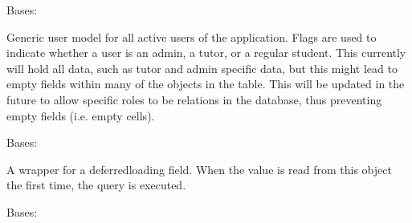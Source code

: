 \documentclass[letterpaper,10pt,english]{sphinxmanual}
\begin{document}
\begin{fulllineitems}
\label{\detokenize{models/user:api.models.user.User}}
\pysigstartsignatures
{}
\pysigstopsignatures
\sphinxAtStartPar
Bases: 

\sphinxAtStartPar
Generic user model for all active users of the application. Flags are used
to indicate whether a user is an admin, a tutor, or a regular student. This
currently will hold all data, such as tutor and admin specific data, but
this might lead to empty fields within many of the objects in the table.
This will be updated in the future to allow specific roles to be relations
in the database, thus preventing empty fields (i.e. empty cells).

\begin{fulllineitems}
\label{\detokenize{models/user:api.models.user.User.DoesNotExist}}
\pysigstartsignatures
{}
\pysigstopsignatures
\sphinxAtStartPar
Bases: 

\end{fulllineitems}


\begin{fulllineitems}
\label{\detokenize{models/user:api.models.user.User.MSOID}}
\pysigstartsignatures
{}
\pysigstopsignatures
\sphinxAtStartPar
A wrapper for a deferred\sphinxhyphen{}loading field. When the value is read from this
object the first time, the query is executed.

\end{fulllineitems}


\begin{fulllineitems}
\label{\detokenize{models/user:api.models.user.User.MultipleObjectsReturned}}
\pysigstartsignatures
{}
\pysigstopsignatures
\sphinxAtStartPar
Bases: 


\end{fulllineitems}
\end{fulllineitems}
\end{document}
